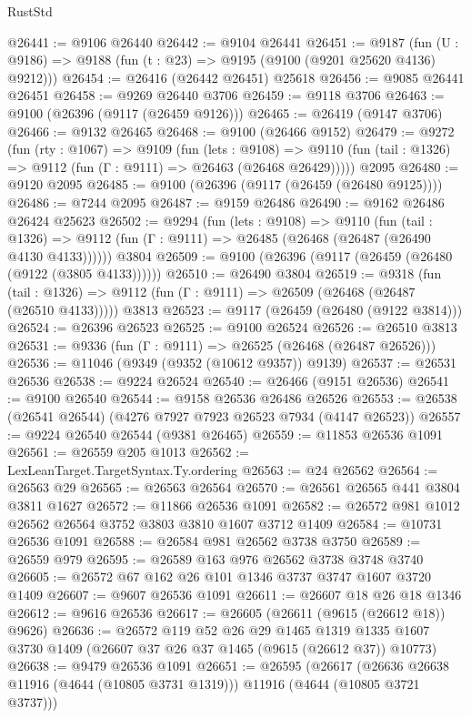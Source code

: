 \begin{lexlean}{RustStd}
\begin{coremodule}
@26441 := @9106 @26440
@26442 := @9104 @26441
@26451 := @9187
    (fun (U : @9186) => @9188 (fun (t : @23) => @9195 (@9100 (@9201 @25620 @4136) @9212)))
@26454 := @26416 (@26442 @26451) @25618
@26456 := @9085 @26441 @26451
@26458 := @9269 @26440 @3706
@26459 := @9118 @3706
@26463 := @9100 (@26396 (@9117 (@26459 @9126)))
@26465 := @26419 (@9147 @3706)
@26466 := @9132 @26465
@26468 := @9100 (@26466 @9152)
@26479 := @9272
    (fun (rty : @1067) =>
    @9109
      (fun (lets : @9108) =>
      @9110 (fun (tail : @1326) => @9112 (fun (Γ : @9111) => @26463 (@26468 @26429)))))
    @2095
@26480 := @9120 @2095
@26485 := @9100 (@26396 (@9117 (@26459 (@26480 @9125))))
@26486 := @7244 @2095
@26487 := @9159 @26486
@26490 := @9162 @26486 @26424 @25623
@26502 := @9294
    (fun (lets : @9108) =>
    @9110
      (fun (tail : @1326) =>
      @9112 (fun (Γ : @9111) => @26485 (@26468 (@26487 (@26490 @4130 @4133))))))
    @3804
@26509 := @9100 (@26396 (@9117 (@26459 (@26480 (@9122 (@3805 @4133))))))
@26510 := @26490 @3804
@26519 := @9318
    (fun (tail : @1326) => @9112 (fun (Γ : @9111) => @26509 (@26468 (@26487 (@26510 @4133)))))
    @3813
@26523 := @9117 (@26459 (@26480 (@9122 @3814)))
@26524 := @26396 @26523
@26525 := @9100 @26524
@26526 := @26510 @3813
@26531 := @9336 (fun (Γ : @9111) => @26525 (@26468 (@26487 @26526)))
@26536 := @11046 (@9349 (@9352 (@10612 @9357)) @9139)
@26537 := @26531 @26536
@26538 := @9224 @26524
@26540 := @26466 (@9151 @26536)
@26541 := @9100 @26540
@26544 := @9158 @26536 @26486 @26526
@26553 := @26538 (@26541 @26544) (@4276 @7927 @7923 @26523 @7934 (@4147 @26523))
@26557 := @9224 @26540 @26544 (@9381 @26465)
@26559 := @11853 @26536 @1091
@26561 := @26559 @205 @1013
@26562 := LexLeanTarget.TargetSyntax.Ty.ordering
@26563 := @24 @26562
@26564 := @26563 @29
@26565 := @26563 @26564
@26570 := @26561 @26565 @441 @3804 @3811 @1627
@26572 := @11866 @26536 @1091
@26582 := @26572 @981 @1012 @26562 @26564 @3752 @3803 @3810 @1607 @3712 @1409
@26584 := @10731 @26536 @1091
@26588 := @26584 @981 @26562 @3738 @3750
@26589 := @26559 @979
@26595 := @26589 @163 @976 @26562 @3738 @3748 @3740
@26605 := @26572 @67 @162 @26 @101 @1346 @3737 @3747 @1607 @3720 @1409
@26607 := @9607 @26536 @1091
@26611 := @26607 @18 @26 @18 @1346
@26612 := @9616 @26536
@26617 := @26605 (@26611 (@9615 (@26612 @18)) @9626)
@26636 := @26572
    @119
    @52
    @26
    @29
    @1465
    @1319
    @1335
    @1607
    @3730
    @1409
    (@26607 @37 @26 @37 @1465 (@9615 (@26612 @37)) @10773)
@26638 := @9479 @26536 @1091
@26651 := @26595
    (@26617 (@26636 @26638 @11916 (@4644 (@10805 @3731 @1319))) @11916 (@4644 (@10805 @3721 @3737)))

\end{coremodule}
\end{lexlean}
